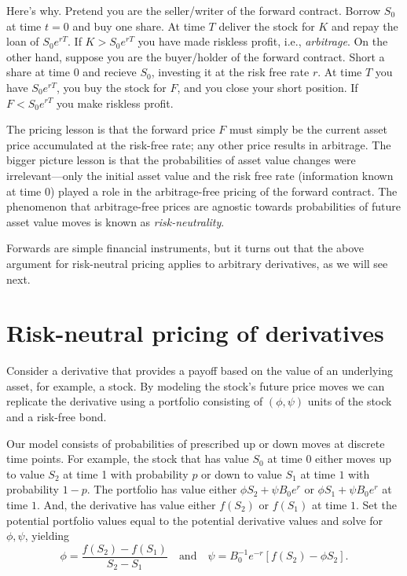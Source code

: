 \documentclass[
]{book}
\begin{document}
Here's why. Pretend you are the seller/writer of the forward contract. Borrow \(S_0\) at time \(t=0\) and buy one share. At time \(T\) deliver the stock for \(K\) and repay the loan of \(S_0e^{rT}\). If \(K > S_0e^{rT}\) you have made riskless profit, i.e., \emph{arbitrage}. On the other hand, suppose you are the buyer/holder of the forward contract. Short a share at time \(0\) and recieve \(S_0\), investing it at the risk free rate \(r\). At time \(T\) you have \(S_0e^{rT}\), you buy the stock for \(F\), and you close your short position. If \(F < S_0e^{rT}\) you make riskless profit.

The pricing lesson is that the forward price \(F\) must simply be the current asset price accumulated at the risk-free rate; any other price results in arbitrage. The bigger picture lesson is that the probabilities of asset value changes were irrelevant---only the initial asset value and the risk free rate (information known at time 0) played a role in the arbitrage-free pricing of the forward contract. The phenomenon that arbitrage-free prices are agnostic towards probabilities of future asset value moves is known as \emph{risk-neutrality}.

Forwards are simple financial instruments, but it turns out that the above argument for risk-neutral pricing applies to arbitrary derivatives, as we will see next.

\hypertarget{risk-neutral-pricing-of-derivatives}{%
\section{Risk-neutral pricing of derivatives}\label{risk-neutral-pricing-of-derivatives}}

Consider a derivative that provides a payoff based on the value of an underlying asset, for example, a stock. By modeling the stock's future price moves we can replicate the derivative using a portfolio consisting of \((\phi, \psi)\) units of the stock and a risk-free bond.

Our model consists of probabilities of prescribed up or down moves at discrete time points. For example, the stock that has value \(S_0\) at time \(0\) either moves up to value \(S_2\) at time 1 with probability \(p\) or down to value \(S_1\) at time \(1\) with probability \(1-p\). The portfolio has value either \(\phi S_2 + \psi B_0e^{r}\) or \(\phi S_1 + \psi B_0e^{r}\) at time \(1\). And, the derivative has value either \(f(S_2)\) or \(f(S_1)\) at time \(1\). Set the potential portfolio values equal to the potential derivative values and solve for \(\phi, \psi\), yielding
\[\phi = \frac{f(S_2)-f(S_1)}{S_2 - S_1}\quad\text{and}\quad \psi = B_0^{-1}e^{-r}[f(S_2) - \phi S_2].\]
\end{document}
